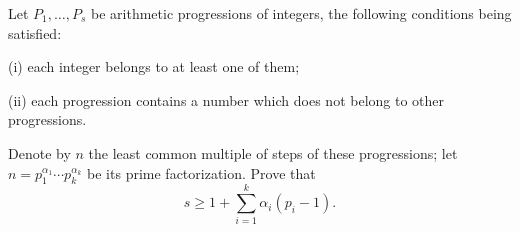 Let $P_1, \ldots, P_s$ be arithmetic progressions of integers, the following conditions being satisfied:

(i) each integer belongs to at least one of them;

(ii) each progression contains a number which does not belong to other progressions.

Denote by $n$ the least common multiple of steps of these progressions; let $n = p_1^{\alpha_1} \cdots p_k^{\alpha_k}$ be its prime factorization. Prove that
\[
s \geq 1 + \sum_{i=1}^{k} \alpha_i (p_i - 1).
\]
